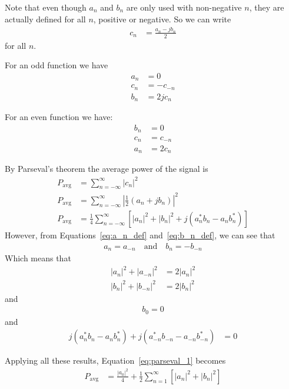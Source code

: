 \documentclass[twocolumn]{myarticle}
\begin{document}
Note that even though $ a_n $ and $ b_n $ are only used with non-negative $ n $, they are actually defined for all $ n $, positive or negative.
So we can write
\begin{align}
    c_n &= \frac{a_n - j b_n}{2}
\end{align}
for all $ n $.

For an odd function we have
\begin{align}
    a_n &= 0
    \\
    c_n &= - c_{-n}
    \\
    b_n &= 2 j c_n
\end{align}

For an even function we have:
\begin{align}
    b_n &= 0
    \\
    c_n &= c_{-n}
    \\
    a_n &= 2 c_n
\end{align}

By Parseval's theorem the average power of the signal is
\begin{align}
    P_\text{avg} &= \sum_{n = -\infty}^{\infty} \left| c_n \right|^2 
    \\
    P_\text{avg} &= \sum_{n = -\infty}^{\infty} \left| \frac{1}{2} \left( a_n + j b_n \right) \right|^2
    \\
    P_\text{avg} &= \frac{1}{4} \sum_{n = -\infty}^{\infty} \left[ \left| a_n \right|^2 + \left| b_n \right|^2 + j \left( a_n^* b_n - a_n b_n^* \right) \right]
    \label{eq:parseval_1}
\end{align}
However, from Equations~\ref{eq:a_n_def} and~\ref{eq:b_n_def}, we can see that
\begin{align}
    a_n = a_{-n} \quad \text{and} \quad b_n = -b_{-n}
\end{align}
Which means that
\begin{align}
    \left| a_n \right|^2 + \left| a_{-n} \right|^2 &= 2 \left| a_n \right|^2
    \\
    \left| b_n \right|^2 + \left| b_{-n} \right|^2 &= 2 \left| b_n \right|^2
\end{align}
and
\begin{align}
    b_0 = 0
\end{align}
and
\begin{align}
    j \left( a_n^* b_n - a_n b_n^* \right) + j \left( a_{-n}^* b_{-n} - a_{-n} b_{-n}^* \right) &= 0
\end{align}

Applying all these results, Equation~\ref{eq:parseval_1} becomes
\begin{align}
    P_\text{avg} &= \frac{|a_0|^2}{4} + \frac{1}{2} \sum_{n = 1}^{\infty} \left[ \left| a_n \right|^2 + \left| b_n \right|^2 \right]
\end{align}
\end{document}

